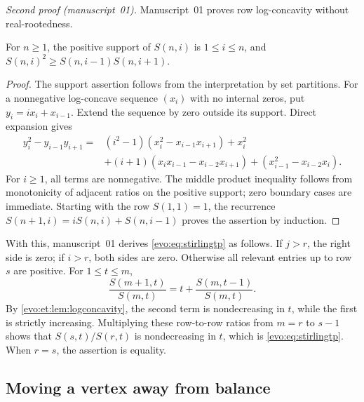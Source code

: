 \documentclass[11pt,a4paper]{article}
\numberwithin{equation}{section}
\theoremstyle{definition}
\theoremstyle{remark}
\begin{document}
\noindent\emph{Second proof (manuscript~01).} Manuscript~01 proves row
log-concavity without real-rootedness.

\begin{lemma}\label{evo:et:lem:logconcavity}
For $n\ge1$, the positive support of $S(n,i)$ is $1\le i\le n$, and
$S(n,i)^2\ge S(n,i-1)S(n,i+1)$.
\end{lemma}
\begin{proof}
The support assertion follows from the interpretation by set partitions. For
a nonnegative log-concave sequence $(x_i)$ with no internal zeros, put
$y_i=ix_i+x_{i-1}$. Extend the sequence by zero outside its support. Direct
expansion gives
\begin{align*}
 y_i^2-y_{i-1}y_{i+1}
 ={}&(i^2-1)(x_i^2-x_{i-1}x_{i+1})+x_i^2\\
 &+(i+1)(x_ix_{i-1}-x_{i-2}x_{i+1})
   +(x_{i-1}^2-x_{i-2}x_i).
\end{align*}
For $i\ge1$, all terms are nonnegative. The middle product inequality follows
from monotonicity of adjacent ratios on the positive support; zero boundary
cases are immediate. Starting with the row $S(1,1)=1$, the recurrence
$S(n+1,i)=iS(n,i)+S(n,i-1)$ proves the assertion by induction.
\end{proof}

With this, manuscript~01 derives \eqref{evo:eq:stirlingtp} as follows. If
$j>r$, the right side is zero; if $i>r$, both sides are zero. Otherwise all
relevant entries up to row $s$ are positive. For $1\le t\le m$,
\[
 \frac{S(m+1,t)}{S(m,t)}=t+\frac{S(m,t-1)}{S(m,t)}.
\]
By \cref{evo:et:lem:logconcavity}, the second term is nondecreasing in $t$,
while the first is strictly increasing. Multiplying these row-to-row ratios
from $m=r$ to $s-1$ shows that $S(s,t)/S(r,t)$ is nondecreasing in $t$, which
is \eqref{evo:eq:stirlingtp}. When $r=s$, the assertion is equality.

\subsection{Moving a vertex away from balance}
\end{document}
